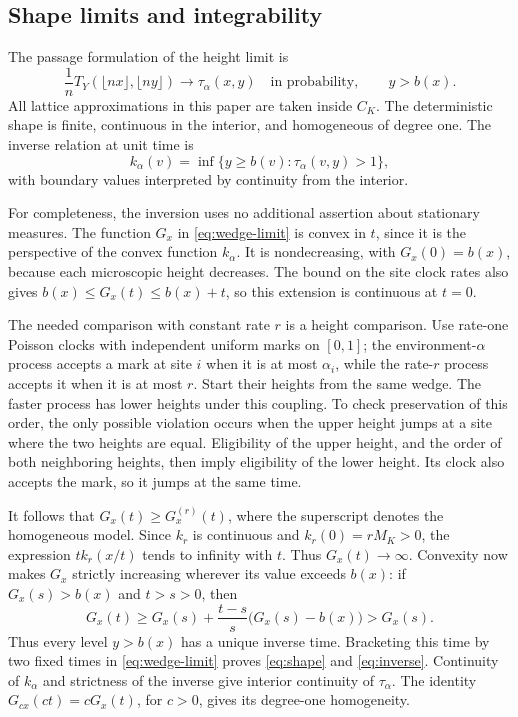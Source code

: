 \documentclass[11pt]{amsart}
\theoremstyle{remark}
\numberwithin{equation}{section}
\begin{document}
\subsection{Shape limits and integrability}
The passage formulation of the height limit is
\begin{equation}\label{eq:shape}
 \frac1n T_Y(\lfloor nx\rfloor,\lfloor ny\rfloor)
 \longrightarrow\tau_\alpha(x,y)
 \quad\text{in probability},\qquad y>b(x).
\end{equation}
All lattice approximations in this paper are taken inside $C_K$.
The deterministic shape is finite, continuous in the interior, and
homogeneous of degree one. The inverse relation at unit time is
\begin{equation}\label{eq:inverse}
 k_\alpha(v)=\inf\{y\geq b(v):\tau_\alpha(v,y)>1\},
\end{equation}
with boundary values interpreted by continuity from the interior.

For completeness, the inversion uses no additional assertion about
stationary measures. The function $G_x$ in \eqref{eq:wedge-limit} is
convex in $t$, since it is the perspective of the convex function
$k_\alpha$. It is nondecreasing, with $G_x(0)=b(x)$, because each
microscopic height decreases. The bound on the site clock rates also
gives $b(x)\leq G_x(t)\leq b(x)+t$, so this extension is continuous
at $t=0$.

The needed comparison with constant rate $r$ is a height comparison.
Use rate-one Poisson clocks with independent uniform marks on $[0,1]$;
the environment-$\alpha$ process accepts a mark at site $i$ when it
is at most $\alpha_i$, while the rate-$r$ process accepts it when it
is at most $r$. Start their heights from the same wedge. The faster
process has lower heights under this coupling. To check preservation
of this order, the only possible violation occurs when the upper
height jumps at a site where the two heights are equal. Eligibility
of the upper height, and the order of both neighboring heights, then
imply eligibility of the lower height. Its clock also accepts the
mark, so it jumps at the same time.

It follows that $G_x(t)\geq G_x^{(r)}(t)$, where the superscript
denotes the homogeneous model. Since $k_r$ is continuous and
$k_r(0)=rM_K>0$, the expression $t k_r(x/t)$ tends to infinity with
$t$. Thus $G_x(t)\to\infty$. Convexity now makes $G_x$
strictly increasing wherever its value exceeds $b(x)$: if
$G_x(s)>b(x)$ and $t>s>0$, then
\[
 G_x(t)\geq G_x(s)+\frac{t-s}{s}\bigl(G_x(s)-b(x)\bigr)>G_x(s).
\]
Thus every level $y>b(x)$ has a unique inverse time. Bracketing this
time by two fixed times in \eqref{eq:wedge-limit} proves
\eqref{eq:shape} and \eqref{eq:inverse}. Continuity of $k_\alpha$
and strictness of the inverse give interior continuity of
$\tau_\alpha$. The identity $G_{cx}(ct)=cG_x(t)$, for $c>0$, gives
its degree-one homogeneity.
\end{document}
